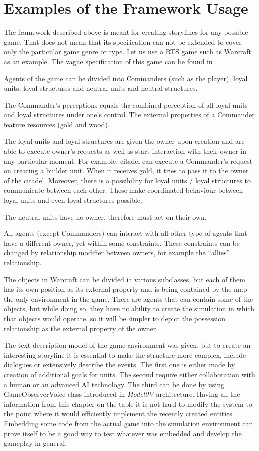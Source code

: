 \section{Examples of the Framework Usage}
The framework described above is meant for creating storylines for any possible game. That does not mean that its specification can not be extended to cover only the particular game genre or type. Let us use a RTS game such as Warcraft as an example.
The vague specification of this game can be found in \cite{warcraft}.
\begin{example}
Agents of the game can be divided into Commanders (such as the player), loyal units, loyal structures and neutral units and neutral structures.\par
The Commander's perceptions equals the combined perception of all loyal units and loyal structures under one's control. The external properties of a Commander feature resourc\breve{}es (gold and wood).\par
The loyal units and loyal structures are given the owner upon creation and are able to execute owner's requests as well as start interaction with their owner in any particular moment. For example, citadel can execute a Commander's request on creating a builder unit. When it receives gold, it tries to pass it to the owner of the citadel. Moreover, there is a possibility for loyal units / loyal structures to communicate between each other. These make coordinated behaviour between loyal units and even loyal structures possible.\par
 The neutral units have no owner, therefore must act on their own. \par
 All agents (except Commanders) can interact with all other type of agents that have a different owner, yet within some constraints. These constraints can be changed by relationship modifier between owners, for example the ``allies'' relationship.\par
  The objects in Warcraft can be divided in various subclasses, but each of them has its own position as its external property and is being contained by the map -- the only environment in the game. There are agents that can contain some of the objects, but while doing so, they have no ability to create the simulation in which that objects would operate, so it will be simpler to depict the possession relationship as the external property of the owner.
 \end{example}
  The text description model of the game environment was given, but to create an interesting storyline it is essential to make the structure more complex, include dialogues or extensively describe the events. The first one is either made by creation of additional goals for units. The second require either collaboration with a human or an advanced AI technology. The third can be done by using GameObserverVoice class introduced in \textit{Model0V} architecture. Having all the information from this chapter on the table it is not hard to modify the system to the point where it would efficiently implement the recently created entities. Embedding some code from the actual game into the simulation environment can prove itself to be a good way to test whatever was embedded and develop the gameplay in general. 